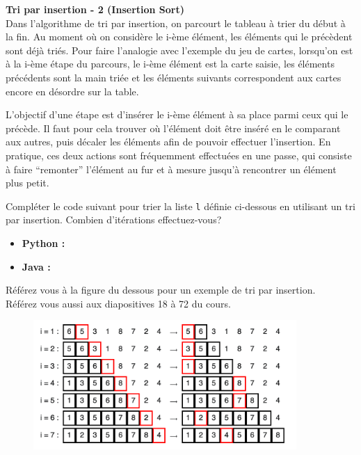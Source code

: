 \begin{Exercice} [20 minutes] \textbf{Tri par insertion - 2 (Insertion Sort)} \\

    Dans l'algorithme de tri par insertion, on parcourt le tableau à trier du début à la fin. Au moment où on considère le i-ème élément, les éléments qui le précèdent sont déjà triés. Pour faire l'analogie avec l'exemple du jeu de cartes, lorsqu'on est à la i-ème étape du parcours, le i-ème élément est la carte saisie, les éléments précédents sont la main triée et les éléments suivants correspondent aux cartes encore en désordre sur la table. 
    
    L'objectif d'une étape est d'insérer le i-ème élément à sa place parmi ceux qui le précède. Il faut pour cela trouver où l'élément doit être inséré en le comparant aux autres, puis décaler les éléments afin de pouvoir effectuer l'insertion. En pratique, ces deux actions sont fréquemment effectuées en une passe, qui consiste à faire ``remonter'' l'élément au fur et à mesure jusqu'à rencontrer un élément plus petit. 
    
    Compléter le code suivant pour trier la liste \lstinline{l} définie ci-dessous en utilisant un tri par insertion. Combien d'itérations effectuez-vous?
    \begin{itemize}
        \item \textbf{Python :}
             
        \item \textbf{Java :}
             
    \end{itemize}
    
    \begin{conseil}
        Référez vous à la figure du dessous pour un exemple de tri par insertion. \\
        Référez vous aussi aux diapositives 18 à 72 du cours.
    \end{conseil}
    
    \begin{figure}[h!]
        \centering
        \includegraphics[width=10cm]{ressources/tri_insertion.png}
    \end{figure}


\end{Exercice}
